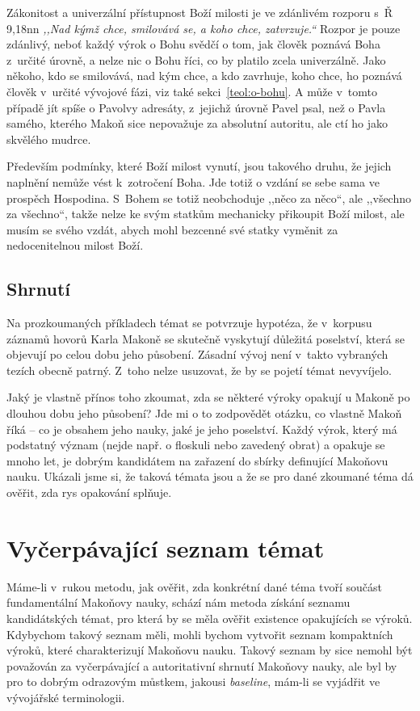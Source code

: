 Zákonitost a univerzální přístupnost Boží milosti je ve zdánlivém rozporu s~Ř
9,18nn \textit{,,Nad kýmž chce, smilovává se, a koho chce, zatvrzuje.``} Rozpor
je pouze zdánlivý, neboť každý výrok o Bohu svědčí o tom, jak člověk poznává
Boha z~určité úrovně, a nelze nic o Bohu říci, co by platilo zcela univerzálně.
Jako někoho, kdo se smilovává, nad kým chce, a kdo zavrhuje, koho chce, ho
poznává člověk v~určité vývojové fázi, viz také sekci~\ref{teol:o-bohu}. A může
v~tomto případě jít spíše o Pavolvy adresáty, z~jejichž úrovně Pavel psal, než o
Pavla samého, kterého Makoň sice nepovažuje za absolutní autoritu, ale ctí ho
jako skvělého mudrce.

Především podmínky, které Boží milost vynutí, jsou takového druhu, že jejich
naplnění nemůže vést k~zotročení Boha. Jde totiž o vzdání se sebe sama ve
prospěch Hospodina. S~Bohem se totiž neobchoduje ,,něco za něco``, ale ,,všechno
za všechno``, takže nelze ke svým statkům mechanicky přikoupit Boží milost, ale
musím se svého vzdát, abych mohl bezcenné své statky vyměnit za nedocenitelnou
milost Boží.

\subsection{Shrnutí}

Na prozkoumaných příkladech témat se potvrzuje hypotéza, že v~korpusu záznamů
hovorů Karla Makoně se skutečně vyskytují důležitá poselství, která se objevují
po celou dobu jeho působení. Zásadní vývoj není v~takto vybraných tezích obecně
patrný. Z~toho nelze usuzovat, že by se pojetí témat nevyvíjelo.

Jaký je vlastně přínos toho zkoumat, zda se některé výroky opakují u Makoně po
dlouhou dobu jeho působení? Jde mi o to zodpovědět otázku, co vlastně Makoň
říká -- co je obsahem jeho nauky, jaké je jeho poselství. Každý výrok, který má
podstatný význam (nejde např. o floskuli nebo zavedený obrat) a opakuje se
mnoho let, je dobrým kandidátem na zařazení do sbírky definující Makoňovu nauku.
Ukázali jsme si, že taková témata jsou a že se pro dané zkoumané téma dá ověřit,
zda rys opakování splňuje.

\section{Vyčerpávající seznam témat}

Máme-li v~rukou metodu, jak ověřit, zda konkrétní dané téma tvoří součást
fundamentální Makoňovy nauky, schází nám metoda získání seznamu kandidátských
témat, pro která by se měla ověřit existence opakujících se výroků. Kdybychom
takový seznam měli, mohli bychom vytvořit seznam kompaktních výroků, které
charakterizují Makoňovu nauku. Takový seznam by sice nemohl být považován za
vyčerpávající a autoritativní shrnutí Makoňovy nauky, ale byl by pro to dobrým
odrazovým můstkem, jakousi \textit{baseline}, mám-li se vyjádřit ve vývojářské
terminologii.

